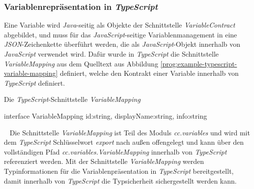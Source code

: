 \subsubsection{Variablenrepräsentation in \emph{TypeScript}}
Eine Variable wird \emph{Java}-seitig als Objekte der Schnittstelle \emph{VariableContract} abgebildet, und muss für das \emph{JavaScript}-seitige Variablenmanagement in eine \emph{JSON}-Zeichenkette überführt werden, die als \emph{JavaScript}-Objekt innerhalb von \emph{JavaScript} verwendet wird. Dafür wurde in \emph{TypeScript} die Schnittstelle \emph{VariableMapping} aus dem Quelltext aus Abbildung \ref{prog:example-typescript-variable-mapping} definiert, welche den Kontrakt einer Variable innerhalb von \emph{TypeScript} definiert.
\begin{program}[h]
\caption{Die \emph{TypeScript}-Schnittstelle \emph{VariableMapping}}
\label{prog:example-typescript-variable-mapping}
\begin{JsCode}
interface VariableMapping {    
    id:string,       
    displayName:string,        
    info:string
}
\end{JsCode}
\end{program}
\ \newline
Die Schnittstelle \emph{VariableMapping} ist Teil des Moduls \emph{cc.variables} und wird mit dem  \emph{TypeScript} Schlüsselwort \emph{export} nach außen offengelegt und kann über den vollständigen Pfad \emph{cc.variables.VariableMapping} innerhalb von \emph{TypeScript} referenziert werden. Mit der Schnittstelle \emph{VariableMapping} werden Typinformationen für die Variablenpräsentation in \emph{TypeScript} bereitgestellt, damit innerhalb von \emph{TypeScript} die Typsicherheit sichergestellt werden kann.

